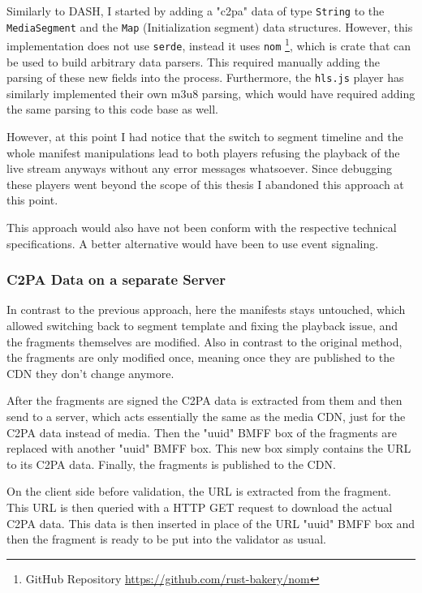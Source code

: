 Similarly to DASH, I started by adding a "c2pa" data of type \texttt{String} to the \texttt{MediaSegment} and the \texttt{Map} (Initialization segment) data structures. However, this implementation does not use \texttt{serde}, instead it uses \texttt{nom} \footnote{GitHub Repository \url{https://github.com/rust-bakery/nom}}, which is crate that can be used to build arbitrary data parsers. This required manually adding the parsing of these new fields into the process. Furthermore, the \texttt{hls.js} player has similarly implemented their own m3u8 parsing, which would have required adding the same parsing to this code base as well.

However, at this point I had notice that the switch to segment timeline and the whole manifest manipulations lead to both players refusing the playback of the live stream anyways without any error messages whatsoever. Since debugging these players went beyond the scope of this thesis I abandoned this approach at this point. 

This approach would also have not been conform with the respective technical specifications. A better alternative would have been to use event signaling. 

\subsubsection{C2PA Data on a separate Server\label{sec:on_server}}

In contrast to the previous approach, here the manifests stays untouched, which allowed switching back to segment template and fixing the playback issue, and the fragments themselves are modified. Also in contrast to the original method, the fragments are only modified once, meaning once they are published to the CDN they don't change anymore.

After the fragments are signed the C2PA data is extracted from them and then send to a server, which acts essentially the same as the media CDN, just for the C2PA data instead of media. Then the "uuid" BMFF box of the fragments are replaced with another "uuid" BMFF box. This new box simply contains the URL to its C2PA data. Finally, the fragments is published to the CDN.

On the client side before validation, the URL is extracted from the fragment. This URL is then queried with a HTTP GET request to download the actual C2PA data. This data is then inserted in place of the URL "uuid" BMFF box and then the fragment is ready to be put into the validator as usual.

